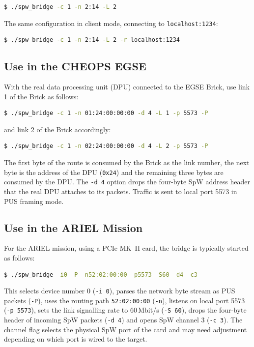 \begin{lstlisting}[language=bash]
  $ ./spw_bridge -c 1 -n 2:14 -L 2
\end{lstlisting}

\noindent
The same configuration in client mode, connecting to
\texttt{localhost:1234}:

\begin{lstlisting}[language=bash]
  $ ./spw_bridge -c 1 -n 2:14 -L 2 -r localhost:1234
\end{lstlisting}

\subsection{Use in the CHEOPS EGSE}

With the real data processing unit (DPU) connected to the \gls{EGSE} Brick,
use link 1 of the Brick as follows:

\begin{lstlisting}[language=bash]
  $ ./spw_bridge -c 1 -n 01:24:00:00:00 -d 4 -L 1 -p 5573 -P
\end{lstlisting}

\noindent
and link 2 of the Brick accordingly:

\begin{lstlisting}[language=bash]
  $ ./spw_bridge -c 1 -n 02:24:00:00:00 -d 4 -L 2 -p 5573 -P
\end{lstlisting}

\noindent
The first byte of the route is consumed by the Brick as the link number, the
next byte is the address of the DPU (\texttt{0x24}) and the remaining three
bytes are consumed by the DPU. The \texttt{-d 4} option drops the four-byte
\gls{SpW} address header that the real DPU attaches to its packets. Traffic is
sent to local port 5573 in \gls{PUS} framing mode.

\subsection{Use in the ARIEL Mission}

For the ARIEL mission, using a PCIe MK~II card, the bridge is typically
started as follows:

\begin{lstlisting}[language=bash]
  $ ./spw_bridge -i0 -P -n52:02:00:00 -p5573 -S60 -d4 -c3
\end{lstlisting}

\noindent
This selects device number 0 (\texttt{-i 0}), parses the network byte stream
as \gls{PUS} packets (\texttt{-P}), uses the routing path \texttt{52:02:00:00}
(\texttt{-n}), listens on local port 5573 (\texttt{-p 5573}), sets the link
signalling rate to 60\,Mbit/s (\texttt{-S 60}), drops the four-byte header of
incoming \gls{SpW} packets (\texttt{-d 4}) and opens \gls{SpW} channel 3
(\texttt{-c 3}). The channel flag selects the physical \gls{SpW} port of the
card and may need adjustment depending on which port is wired to the target.


